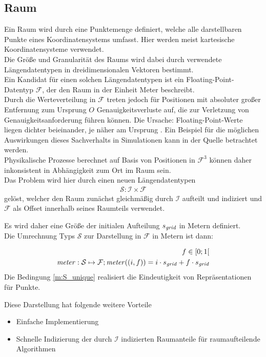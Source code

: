 \subsection{Raum}
\label{sec:space}
Ein Raum wird durch eine Punktemenge definiert, welche alle darstellbaren Punkte eines Koordinatensystems umfasst. Hier werden meist kartesische Koordinatensysteme verwendet.\\
Die Größe und Granularität des Raums wird dabei durch verwendete Längendatentypen in dreidimensionalen Vektoren bestimmt.\\
Ein Kandidat für einen solchen Längendatentypen ist ein Floating-Point-Datentyp  $\mathcal{F}$, der den Raum in der Einheit Meter beschreibt.\\
Durch die Werteverteilung in $\mathcal{F}$ treten jedoch für Positionen mit absoluter großer Entfernung zum Ursprung $O$ Genauigkeitsverluste auf, die zur Verletzung von Genauigkeitsanforderung führen können. 
Die Ursache: Floating-Point-Werte liegen dichter beieinander, je näher am Ursprung \cite{floatdistribution}. Ein Beispiel für die möglichen Auswirkungen dieses Sachverhalts in Simulationen kann in der Quelle \cite{floatdistributionexample} betrachtet werden.\\
Physikalische Prozesse berechnet auf Basis von Positionen in $\mathcal{F}^3$ können daher inkonsistent in Abhängigkeit zum Ort im Raum sein.\\
Das Problem wird hier durch einen neuen Längendatentypen 
\begin{align}
	\mathcal{S} : \mathcal{I} \times \mathcal{F}
\end{align} gelöst, welcher den Raum zunächst gleichmäßig durch $\mathcal{I}$ aufteilt und indiziert und $\mathcal{F}$ als Offset innerhalb seines Raumteils verwendet. 

Es wird daher eine Größe der initialen Aufteilung $s_{\mathit{grid}}$ in Metern definiert.\\
Die Umrechnung Typs $\mathcal{S}$ zur Darstellung in $\mathcal{F}$ in Metern ist dann:

\begin{align}
	f \in [0;1[ \label{m:S_unique} \\
	\mathit{meter}: \mathcal{S} \mapsto \mathcal{F};  \mathit{meter}((i, f)) = i \cdot s_{\mathit{grid}} + f \cdot s_{\mathit{grid}}
\end{align}
Die Bedingung \ref{m:S_unique} realisiert die Eindeutigkeit von Repräsentationen für Punkte.

Diese Darstellung hat folgende weitere Vorteile
\begin{itemize}
\item Einfache Implementierung
\item Schnelle Indizierung der durch $\mathcal{I}$ indizierten Raumanteile für raumaufteilende Algorithmen
\end{itemize}

